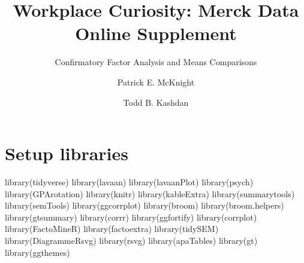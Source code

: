 \documentclass[
  letterpaper,
  DIV=11,
  numbers=noendperiod]{scrartcl}
\title{Workplace Curiosity: Merck Data Online Supplement}
\subtitle{Confirmatory Factor Analysis and Means Comparisons}
\author{Patrick E. McKnight \and Todd B. Kashdan}
\date{}
\newenvironment{Shaded}{\begin{snugshade}}{\end{snugshade}}
\newcommand{\FunctionTok}[1]{\textcolor[rgb]{0.28,0.35,0.67}{#1}}
\newcommand{\NormalTok}[1]{\textcolor[rgb]{0.00,0.23,0.31}{#1}}
\renewcommand*\contentsname{Table of contents}
\newcommand\contentsname{Table of contents}
\begin{document}
\maketitle

\renewcommand*\contentsname{Table of contents}
{
\hypersetup{linkcolor=}
\setcounter{tocdepth}{3}
\tableofcontents
}
\section{Setup libraries}\label{setup-libraries}

\begin{Shaded}
\begin{Highlighting}[]
\FunctionTok{library}\NormalTok{(tidyverse)}
\FunctionTok{library}\NormalTok{(lavaan)}
\FunctionTok{library}\NormalTok{(lavaanPlot)}
\FunctionTok{library}\NormalTok{(psych)}
\FunctionTok{library}\NormalTok{(GPArotation)}
\FunctionTok{library}\NormalTok{(knitr)}
\FunctionTok{library}\NormalTok{(kableExtra)}
\FunctionTok{library}\NormalTok{(summarytools)}
\FunctionTok{library}\NormalTok{(semTools)}
\FunctionTok{library}\NormalTok{(ggcorrplot)}
\FunctionTok{library}\NormalTok{(broom)}
\FunctionTok{library}\NormalTok{(broom.helpers)}
\FunctionTok{library}\NormalTok{(gtsummary)}
\FunctionTok{library}\NormalTok{(corrr)}
\FunctionTok{library}\NormalTok{(ggfortify)}
\FunctionTok{library}\NormalTok{(corrplot)}
\FunctionTok{library}\NormalTok{(FactoMineR)}
\FunctionTok{library}\NormalTok{(factoextra)}
\FunctionTok{library}\NormalTok{(tidySEM)}
\FunctionTok{library}\NormalTok{(DiagrammeRsvg)}
\FunctionTok{library}\NormalTok{(rsvg)}
\FunctionTok{library}\NormalTok{(apaTables)}
\FunctionTok{library}\NormalTok{(gt)}
\FunctionTok{library}\NormalTok{(ggthemes)}


\end{Highlighting}
\end{Shaded}
\end{document}
